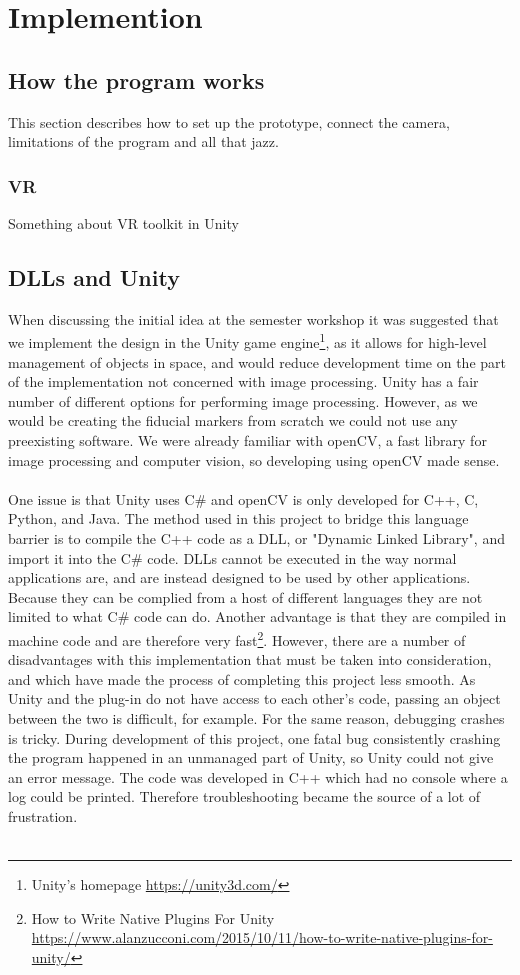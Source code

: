 \chapter{Implemention}
	\section{How the program works}
	This section describes how to set up the prototype, connect the camera, limitations of the program and all that jazz.
	\subsection{VR}
	Something about VR toolkit in Unity
	\section{DLLs and Unity}
		When discussing the initial idea at the semester workshop it was suggested that we implement the design in the Unity game engine\footnote{Unity's homepage \url{https://unity3d.com/}}, as it allows for high-level management of objects in space, and would reduce development time on the part of the implementation not concerned with image processing. Unity has a fair number of different options for performing image processing. However, as we would be creating the fiducial markers from scratch we could not use any preexisting software. We were already familiar with openCV, a fast library for image processing and computer vision, so developing using openCV made sense.\\\\
		One issue is that Unity uses C\# and openCV is only developed for C++, C, Python, and Java. The method used in this project to bridge this language barrier is to compile the C++ code as a DLL, or "Dynamic Linked Library", and import it into the C\# code. DLLs  cannot be executed in the way normal applications are, and are instead designed to be used by other applications. Because they can be complied from a host of different languages they are not limited to what C\# code can do. Another advantage is that they are compiled in machine code and are therefore very fast\footnote{How to Write Native Plugins For Unity \url{https://www.alanzucconi.com/2015/10/11/how-to-write-native-plugins-for-unity/}}. However, there are a number of disadvantages with this implementation that must be taken into consideration, and which have made the process of completing this project less smooth. As Unity and the plug-in do not have access to each other's code, passing an object between the two is difficult, for example. For the same reason, debugging crashes is tricky. During development of this project, one fatal bug consistently crashing the program happened in an unmanaged part of Unity, so Unity could not give an error message. The code was developed in C++ which had no console where a log could be printed. Therefore troubleshooting became the source of a lot of frustration.\\\\
